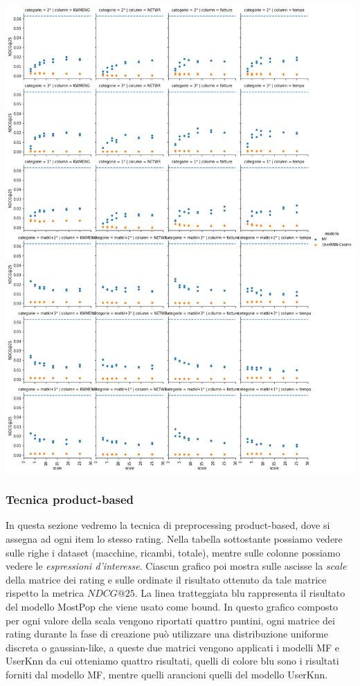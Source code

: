 \includegraphics[width=16cm]{figures/risultati_minmax_categoria_totale.png}


\subsubsection{Tecnica product-based}
In questa sezione vedremo la tecnica di preprocessing product-based, dove si assegna ad ogni item lo stesso rating.
Nella tabella sottostante possiamo vedere sulle righe i dataset (macchine, ricambi, totale), mentre sulle colonne possiamo vedere le \textit{espressioni d'interesse}. Ciascun grafico poi mostra sulle ascisse la $scale$ della matrice dei rating e sulle ordinate il risultato ottenuto da tale matrice rispetto la metrica $NDCG@25$. La linea tratteggiata blu rappresenta il risultato del modello MostPop che viene usato come bound.
In questo grafico composto per ogni valore della scala vengono riportati quattro puntini, ogni matrice dei rating durante la fase di creazione può utilizzare una distribuzione uniforme discreta o gaussian-like, a queste due matrici vengono applicati i modelli MF e UserKnn da cui otteniamo quattro risultati, quelli di colore blu sono i risultati forniti dal modello MF, mentre quelli arancioni quelli del modello UserKnn.\\

